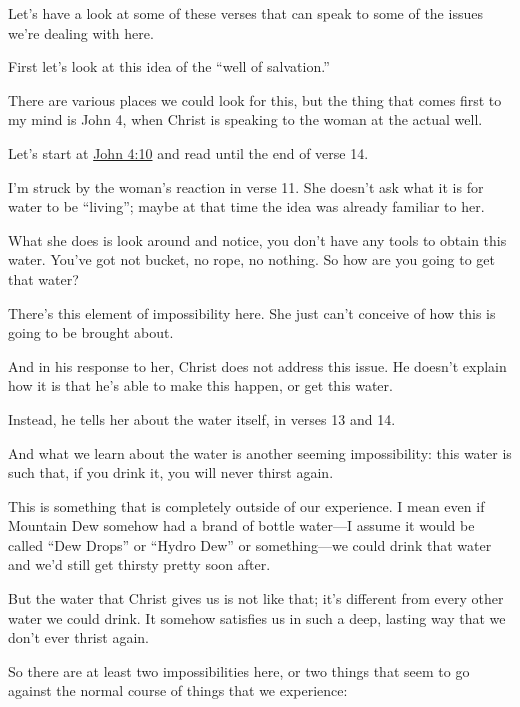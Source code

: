 \begin{compactitem}
			\item Let's have a look at some of these verses that can speak to some of the issues we're dealing with here.
				\begin{compactitem}
					\item First let's look at this idea of the ``well of salvation.''
					\item There are various places we could look for this, but the thing that comes first to my mind is John 4, when Christ is speaking to the woman at the actual well.
					\item Let's start at \hyperref[JOHN-4-10]{John 4:10} and read until the end of verse 14. 
						\begin{compactitem}
							\item I'm struck by the woman's reaction in verse 11. She doesn't ask what it is for water to be ``living''; maybe at that time the idea was already familiar to her.
							\item What she does is look around and notice, you don't have any tools to obtain this water. You've got not bucket, no rope, no nothing. So how are you going to get that water?
							\item There's this element of impossibility here. She just can't conceive of how this is going to be brought about.
							\item And in his response to her, Christ does not address this issue. He doesn't explain how it is that he's able to make this happen, or get this water. 
							\item Instead, he tells her about the water itself, in verses 13 and 14.
							\item And what we learn about the water is another seeming impossibility: this water is such that, if you drink it, you will never thirst again.
							\item This is something that is completely outside of our experience. I mean even if Mountain Dew somehow had a brand of bottle water---I assume it would be called ``Dew Drops'' or ``Hydro Dew'' or something---we could drink that water and we'd still get thirsty pretty soon after.
							\item But the water that Christ gives us is not like that; it's different from every other water we could drink. It somehow satisfies us in such a deep, lasting way that we don't ever thrist again. 
							\item So there are at least two impossibilities here, or two things that seem to go against the normal course of things that we experience:

\end{compactitem}
\end{compactitem}
\end{compactitem}
